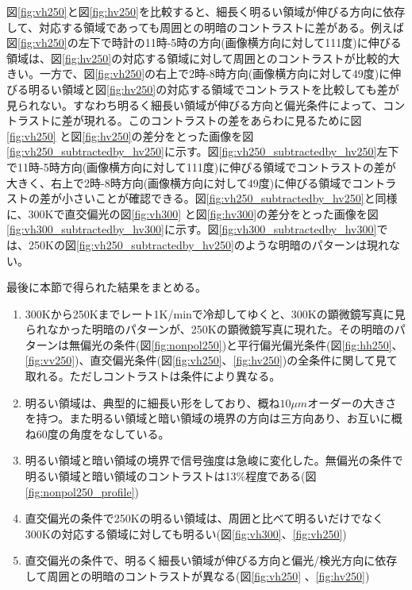 \documentclass[11pt,a4paper]{jsarticle}
\begin{document}
図\ref{fig:vh250}と図\ref{fig:hv250}を比較すると、細長く明るい領域が伸びる方向に依存して、対応する領域であっても周囲との明暗のコントラストに差がある。例えば図\ref{fig:vh250}の左下で時計の11時-5時の方向(画像横方向に対して111度)に伸びる領域は、図\ref{fig:hv250}の対応する領域に対して周囲とのコントラストが比較的大きい。一方で、図\ref{fig:vh250}の右上で2時-8時方向(画像横方向に対して49度)に伸びる明るい領域と図\ref{fig:hv250}の対応する領域でコントラストを比較しても差が見られない。すなわち明るく細長い領域が伸びる方向と偏光条件によって、コントラストに差が現れる。このコントラストの差をあらわに見るために図\ref{fig:vh250} と図\ref{fig:hv250}の差分をとった画像を図\ref{fig:vh250_subtractedby_hv250}に示す。図\ref{fig:vh250_subtractedby_hv250}左下で11時-5時方向(画像横方向に対して111度)に伸びる領域でコントラストの差が大きく、右上で2時-8時方向(画像横方向に対して49度)に伸びる領域でコントラストの差が小さいことが確認できる。図\ref{fig:vh250_subtractedby_hv250}と同様に、300Kで直交偏光の図\ref{fig:vh300} と図\ref{fig:hv300}の差分をとった画像を図\ref{fig:vh300_subtractedby_hv300}に示す。図\ref{fig:vh300_subtractedby_hv300}では、250Kの図\ref{fig:vh250_subtractedby_hv250}のような明暗のパターンは現れない。

最後に本節で得られた結果をまとめる。
\begin{enumerate}
\item 300Kから250Kまでレート1K/minで冷却してゆくと、300Kの顕微鏡写真に見られなかった明暗のパターンが、250Kの顕微鏡写真に現れた。その明暗のパターンは無偏光の条件(図\ref{fig:nonpol250})と平行偏光偏光条件(図\ref{fig:hh250}、\ref{fig:vv250})、直交偏光条件(図\ref{fig:vh250}、\ref{fig:hv250})の全条件に関して見て取れる。ただしコントラストは条件により異なる。
\item 明るい領域は、典型的に細長い形をしており、概ね$10 \mu m$オーダーの大きさを持つ。また明るい領域と暗い領域の境界の方向は三方向あり、お互いに概ね60度の角度をなしている。
\item 明るい領域と暗い領域の境界で信号強度は急峻に変化した。無偏光の条件で明るい領域と暗い領域のコントラストは13\%程度である(図\ref{fig:nonpol250_profile})
\item 直交偏光の条件で250Kの明るい領域は、周囲と比べて明るいだけでなく300Kの対応する領域に対しても明るい(図\ref{fig:vh300}、\ref{fig:vh250})
\item 直交偏光の条件で、明るく細長い領域が伸びる方向と偏光/検光方向に依存して周囲との明暗のコントラストが異なる(図\ref{fig:vh250} 、\ref{fig:hv250})
 \end{enumerate}
\end{document}

